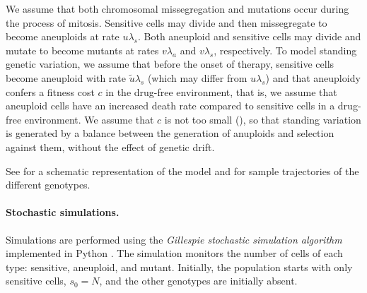 \documentclass[12pt]{extarticle}
\begin{document}
We assume that both chromosomal missegregation and mutations occur during the process of mitosis. 
Sensitive cells may divide and then missegregate to become aneuploids at rate $u\lambda_s$.
Both aneuploid and sensitive cells may divide and mutate to become mutants at rates $v\lambda_{a}$ and $v\lambda_{s}$, respectively.
To model standing genetic variation, we assume that before the onset of therapy, sensitive cells become aneuploid with rate $\tilde{u}\lambda_s$ (which may differ from $u \lambda_s$) and that aneuploidy confers a fitness cost $c$ in the drug-free environment, that is, we assume that aneuploid cells have an increased death rate compared to sensitive cells in a drug-free environment. We assume that $c$ is not too small (), so that standing variation is generated by a balance between the generation of anuploids and selection against them, without the effect of genetic drift.

See  for a schematic representation of the model and  for sample trajectories of the different genotypes. 


\paragraph{Stochastic simulations.} 
Simulations are performed using the \emph{Gillespie stochastic simulation algorithm} \citep{gillespie1976general,gillespie1977exact} implemented in Python \citep{python}.
The simulation monitors the number of cells of each type: sensitive, aneuploid, and mutant. 
Initially, the population starts with only sensitive cells, $s_0=N$, and the other genotypes are initially absent.
\end{document}
